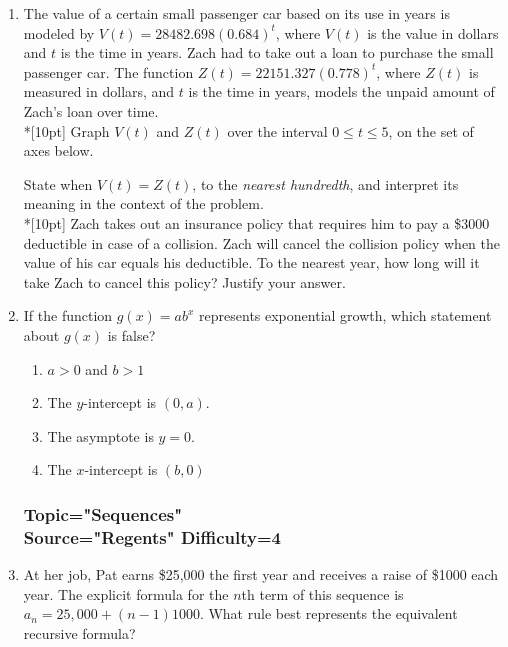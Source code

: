 \documentclass[12pt, oneside]{article}
\begin{document}
\begin{enumerate}
\item The value of a certain small passenger car based on its use in years is modeled by $V(t) =28482.698(0.684)^t$, where $V(t)$ is the value in dollars and $t$ is the time in years. Zach had to take out a loan to purchase the small passenger car. The function $Z(t)=22151.327(0.778)^t$, where $Z(t)$ is measured in dollars, and $t$ is the time in years, models the unpaid amount of Zach’s loan over time.\\*[10pt]
Graph $V(t)$ and $Z(t)$ over the interval $0 \leq t \leq 5$, on the set of axes below.
\begin{center}
\end{center}
State when $V(t)=Z(t)$, to the \emph{nearest hundredth}, and interpret its meaning in the context of the problem.\\*[10pt]
Zach takes out an insurance policy that requires him to pay a \$3000 deductible in case of a collision. Zach will cancel the collision policy when the value of his car equals his deductible. To the nearest year, how long will it take Zach to cancel this policy? Justify your answer. %

\item If the function $g(x) = ab^x$ represents exponential growth, which statement about $g(x)$ is false?
\begin{enumerate}
    \item $a > 0$ and $b>1$
    \item The $y$-intercept is $(0, a)$.
    \item The asymptote is $y=0$.
    \item The $x$-intercept is $(b,0)$
\end{enumerate} %

\subsubsection*{Topic="Sequences"\\
Source="Regents" 
Difficulty=4}

\item At her job, Pat earns \$25,000 the first year and receives a raise of \$1000 each year. The explicit formula for the $n$th term of this sequence is $a_n = 25,000 + (n - 1)1000$. What rule best represents the equivalent recursive formula?


\end{enumerate}
\end{document}
